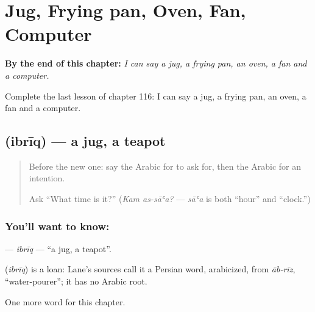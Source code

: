 
\chapter{Jug, Frying pan, Oven, Fan, Computer}
\label{ch:ar-jug-frying-pan-oven-fan-computer}

\begin{chapteropening}
\textbf{By the end of this chapter:} \emph{I can say a jug, a frying pan, an oven, a fan and a computer.}

Complete the last lesson of chapter 116: I can say a jug, a frying pan, an oven, a fan and a computer.
\end{chapteropening}

\section[\texorpdfstring{\ar{إبريق} (ibrīq)}{إبريق (ibrīq)}]{ (ibrīq) — a jug, a teapot}

\label{lesson:AR-C116-ibriq}



\begin{quote}
Before the new one: say the Arabic for to ask for, then the Arabic for an intention.

Ask \textquotedblleft{}What time is it?\textquotedblright{} (\emph{Kam as-sāʿa?} — \emph{sāʿa} is both \textquotedblleft{}hour\textquotedblright{} and \textquotedblleft{}clock.\textquotedblright{})
\end{quote}

\subsection*{You'll want to know: }
\textbf{} — \emph{ibrīq} — \textquotedblleft{}a jug, a teapot\textquotedblright{}.

\begin{cousinweb}
\textbf{} (\emph{ibrīq}) is a loan: Lane's sources call it a Persian word, arabicized, from \emph{āb-rīz}, \textquotedblleft{}water-pourer\textquotedblright{}; it has no Arabic root.
\end{cousinweb}

\begin{grammarlens}[title={What you've built}]
One more word for this chapter.
\end{grammarlens}

